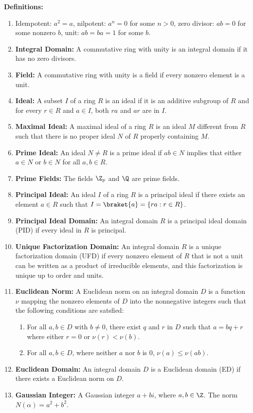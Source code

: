 \documentclass[notitlepage]{report}
\begin{document}
  \textbf{Definitions:}
  \begin{enumerate}
    \item Idempotent: $a^2 = a$, nilpotent: $a^n = 0$ for some $n > 0$, zero divisor: $ab = 0$ for some nonzero $b$, unit: $ab = ba = 1$ for some $b$.
    \item \textbf{Integral Domain:} A commutative ring with unity is an integral domain if it has no zero divisors.
    \item \textbf{Field:} A commutative ring with unity is a field if every nonzero element is a unit.
    \item \textbf{Ideal:} A subset $I$ of a ring $R$ is an ideal if it is an additive subgroup of $R$ and for every $r \in R$ and $a \in I$, both $ra$ and $ar$ are in $I$.
    \item \textbf{Maximal Ideal:} A maximal ideal of a ring $R$ is an ideal $M$ different from $R$ such that there is no proper ideal $N$ of $R$ properly containing $M$.
    \item \textbf{Prime Ideal:} An ideal $N \ne R$ is a prime ideal if $ab \in N$ implies that either $a \in N$ or $b \in N$ for all $a, b \in R$.
    \item \textbf{Prime Fields:} The fields $\Z_p$ and $\Q$ are prime fields.
    \item \textbf{Principal Ideal:} An ideal $I$ of a ring $R$ is a principal ideal if there exists an element $a \in R$ such that $I = \braket{a} = \{ra : r \in R\}$.
    \item \textbf{Principal Ideal Domain:} An integral domain $R$ is a principal ideal domain (PID) if every ideal in $R$ is principal.
    \item \textbf{Unique Factorization Domain:} An integral domain $R$ is a unique factorization domain (UFD) if every nonzero element of $R$ that is not a unit can be written as a product of irreducible elements, and this factorization is unique up to order and units.
    \item \textbf{Euclidean Norm:} A Euclidean norm on an integral domain $D$ is a function $\nu$ mapping the nonzero elements of $D$ into the nonnegative integers such that the following conditions are satsfied:
      \begin{enumerate}
        \item For all $a, b \in D$ with $b \ne 0$, there exist $q$ and $r$ in $D$ such that $a = bq + r$ where either $r = 0$ or $\nu(r) < \nu(b)$.
        \item For all $a, b \in D$, where neither $a$ nor $b$ is 0, $\nu(a) \le \nu(ab)$.
      \end{enumerate}
    \item \textbf{Euclidean Domain:} An integral domain $D$ is a Euclidean domain (ED) if there exists a Euclidean norm on $D$.
    \item \textbf{Gaussian Integer:} A Gaussian integer $a + bi$, where $a, b \in \Z$. The norm $N(\alpha) = a^2 + b^2$.
  \end{enumerate}
\end{document}

